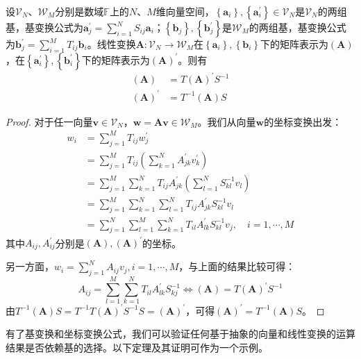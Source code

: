 \documentclass[main.tex]{subfiles}
\begin{document}
\begin{theorem}\label{thm:II.4.14}
设$\mathcal{V}_N$、$\mathcal{W}_M$分别是数域$\mathbb{F}$上的$N$、$M$维向量空间，$\left\{\mathbf{a}_i\right\},\left\{\mathbf{a}^\prime_i\right\}\in\mathcal{V}_N$是$\mathcal{V}_N$的两组基，基变换公式为$\mathbf{a}^\prime_j=\sum_{i=1}^NS_{ij}\mathbf{a}_i$；$\left\{\mathbf{b}_j\right\},\left\{\mathbf{b}^\prime_j\right\}$是$\mathcal{W}_M$的两组基，基变换公式为$\mathbf{b}^\prime_j=\sum_{i=1}^MT_{ij}\mathbf{b}_i$。线性变换$\mathbf{A}:\mathcal{V}_N\rightarrow\mathcal{W}_M$在$\left\{\mathbf{a}_i\right\},\left\{\mathbf{b}_i\right\}$下的矩阵表示为$\left(\mathbf{A}\right)$，在$\left\{\mathbf{a}^\prime_i\right\},\left\{\mathbf{b}^\prime_i\right\}$下的矩阵表示为$\left(\mathbf{A}\right)^\prime$。则有
\begin{align*}
    \left(\mathbf{A}\right)&=T\left(\mathbf{A}\right)^\prime S^{-1}\\
    \left(\mathbf{A}\right)^\prime&=T^{-1}\left(\mathbf{A}\right)S
\end{align*}
\end{theorem}
\begin{proof}
对于任一向量$\mathbf{v}\in\mathcal{V}_N$，$\mathbf{w}=\mathbf{Av}\in\mathcal{W}_M$。我们从向量$\mathbf{w}$的坐标变换出发：
\begin{align*}
    w_i&=\sum_{j=1}^MT_{ij}w^\prime_j\\
    &=\sum_{j=1}^MT_{ij}\left(\sum_{k=1}^NA^\prime_{jk}v^\prime_k\right)\\
    &=\sum_{j=1}^M\sum_{k=1}^NT_{ij}A^\prime_{jk}\left(\sum_{l=1}^NS^{-1}_{kl}v_l\right)\\
    &=\sum_{j=1}^M\sum_{k=1}^N\sum_{l=1}^NT_{ij}A^\prime_{jk}S^{-1}_{kl}v_l\\
    &=\sum_{j=1}^N\sum_{l=1}^M\sum_{k=1}^NT_{il}A^\prime_{lk}S^{-1}_{kl}v_j,\quad i=1,\cdots,M
\end{align*}
其中$A_{ij},A^\prime_{ij}$分别是$\left(\mathbf{A}\right),\left(\mathbf{A}\right)^\prime$的坐标。

另一方面，$w_i=\sum_{j=1}^NA_{ij}v_j,i=1,\cdots,M$，与上面的结果比较可得：
\[
A_{ij}=\sum_{l=1}^M\sum_{k=1}^NT_{il}A^\prime_{lk}S^{-1}_{kj}
\Leftrightarrow \left(\mathbf{A}\right)=T\left(\mathbf{A}\right)^\prime S^{-1}
\]
由$T^{-1}\left(\mathbf{A}\right)S=T^{-1}T\left(\mathbf{A}\right)^\prime S^{-1}S=\left(\mathbf{A}\right)^\prime$，可得$\left(\mathbf{A}\right)^\prime=T^{-1}\left(\mathbf{A}\right)S$。
\end{proof}

有了基变换和坐标变换公式，我们可以验证任何基于抽象的向量和线性变换的运算结果是否依赖基的选择。以下定理及其证明可作为一个示例。
\end{document}
